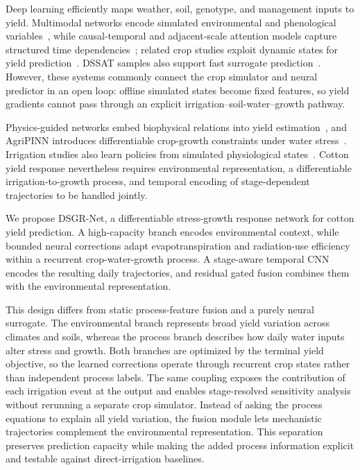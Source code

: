 \documentclass{article}
\begin{document}
Deep learning efficiently maps weather, soil, genotype, and management inputs to yield. Multimodal networks encode simulated environmental and phenological variables~\cite{sajid2025}, while causal-temporal and adjacent-scale attention models capture structured time dependencies~\cite{liu2024ctattn,jiang2024asformer}; related crop studies exploit dynamic states for yield prediction~\cite{moon2023,hao2026}. DSSAT samples also support fast surrogate prediction~\cite{wang2025}. However, these systems commonly connect the crop simulator and neural predictor in an open loop: offline simulated states become fixed features, so yield gradients cannot pass through an explicit irrigation--soil-water--growth pathway.

Physics-guided networks embed biophysical relations into yield estimation~\cite{cao2026}, and AgriPINN introduces differentiable crop-growth constraints under water stress~\cite{agripinn}. Irrigation studies also learn policies from simulated physiological states~\cite{yi2026,chen2025dac,liu2026irl}. Cotton yield response nevertheless requires environmental representation, a differentiable irrigation-to-growth process, and temporal encoding of stage-dependent trajectories to be handled jointly.

We propose DSGR-Net, a differentiable stress-growth response network for cotton yield prediction. A high-capacity branch encodes environmental context, while bounded neural corrections adapt evapotranspiration and radiation-use efficiency within a recurrent crop-water-growth process. A stage-aware temporal CNN encodes the resulting daily trajectories, and residual gated fusion combines them with the environmental representation.

This design differs from static process-feature fusion and a purely neural surrogate. The environmental branch represents broad yield variation across climates and soils, whereas the process branch describes how daily water inputs alter stress and growth. Both branches are optimized by the terminal yield objective, so the learned corrections operate through recurrent crop states rather than independent process labels. The same coupling exposes the contribution of each irrigation event at the output and enables stage-resolved sensitivity analysis without rerunning a separate crop simulator.
Instead of asking the process equations to explain all yield variation, the fusion module lets mechanistic trajectories complement the environmental representation. This separation preserves prediction capacity while making the added process information explicit and testable against direct-irrigation baselines.
\end{document}
